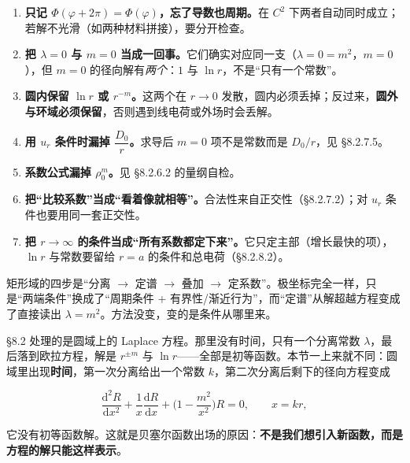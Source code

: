 
\begin{enumerate}[label=(\arabic*)]
  \item \textbf{只记 $\Phi(\varphi+2\pi)=\Phi(\varphi)$，忘了导数也周期。}在 $C^2$ 下两者自动同时成立；若解不光滑（如两种材料拼接），要分开检查。
  \item \textbf{把 $\lambda=0$ 与 $m=0$ 当成一回事。}它们确实对应同一支（$\lambda=0=m^2$，$m=0$），但 $m=0$ 的径向解有\emph{两个}：$1$ 与 $\ln r$，不是“只有一个常数”。
  \item \textbf{圆内保留 $\ln r$ 或 $r^{-m}$。}这两个在 $r\to0$ 发散，圆内必须丢掉；反过来，\textbf{圆外与环域必须保留}，否则遇到线电荷或外场时会丢解。
  \item \textbf{用 $u_r$ 条件时漏掉 $\dfrac{D_0}{r}$。}求导后 $m=0$ 项不是常数而是 $D_0/r$，见 \S8.2.7.5。
  \item \textbf{系数公式漏掉 $\rho_0^m$。}见 \S8.2.6.2 的量纲自检。
  \item \textbf{把“比较系数”当成“看着像就相等”。}合法性来自正交性（\S8.2.7.2）；对 $u_r$ 条件也要用同一套正交性。
  \item \textbf{把 $r\to\infty$ 的条件当成“所有系数都定下来”。}它只定主部（增长最快的项），$\ln r$ 与常数要留给 $r=a$ 的条件和总电荷（\S8.2.8.2）。
\end{enumerate}


矩形域的四步是“分离 $\to$ 定谱 $\to$ 叠加 $\to$ 定系数”。极坐标完全一样，只是“两端条件”换成了“周期条件 + 有界性/渐近行为”，而“定谱”从解超越方程变成了直接读出 $\lambda=m^2$。方法没变，变的是条件从哪里来。

\needspace{0.44\textheight}

\label{sec:83}



\S8.2 处理的是圆域上的 Laplace 方程。那里没有时间，只有一个分离常数 $\lambda$，最后落到欧拉方程，解是 $r^{\pm m}$ 与 $\ln r$——全部是初等函数。本节一上来就不同：圆域里出现\textbf{时间}，第一次分离给出一个常数 $k$，第二次分离后剩下的径向方程变成

\[
\frac{\mathrm d^2R}{\mathrm dx^2}+\frac1x\frac{\mathrm dR}{\mathrm dx}+\Big(1-\frac{m^2}{x^2}\Big)R=0,\qquad x=kr,
\]

它没有初等函数解。这就是贝塞尔函数出场的原因：\textbf{不是我们想引入新函数，而是方程的解只能这样表示}。

